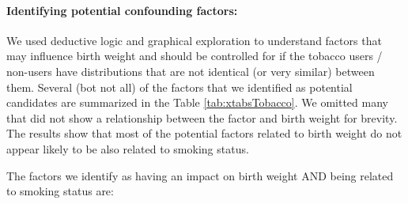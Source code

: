 \documentclass[a4paper, 12pt]{article}
\begin{document}
\paragraph{Identifying potential confounding factors:}
We used deductive logic and graphical exploration to understand factors that may influence birth weight and should be controlled for if the tobacco users / non-users have distributions that are not identical (or very similar) between them.  Several (bot not all) of the factors that we identified as potential candidates are summarized in the Table \ref{tab:xtabsTobacco}.  We omitted many that did not show a relationship between the factor and birth weight for brevity.  The results show that most of the potential factors related to birth weight do not appear likely to be also related to smoking status.  \newline




The factors we identify as having an impact on birth weight AND being related to smoking status are:
\end{document}
